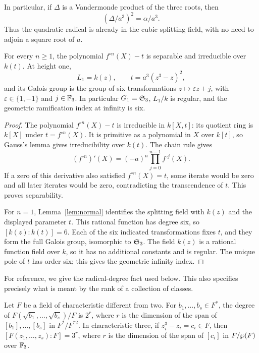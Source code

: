 In particular, if $\Delta$ is a Vandermonde product of the three
roots, then
\begin{equation}\label{eq:betavandermonde}
 (\Delta/a^3)^2=\alpha/a^3.
\end{equation}
Thus the quadratic radical is already in the cubic splitting field,
with no need to adjoin a square root of $a$.

\begin{lemma}\label{lem:first}
For every $n\geq1$, the polynomial $f^{\circ n}(X)-t$ is separable
and irreducible over $k(t)$. At height one,
\[
 L_1=k(z),\qquad t=a^3(z^3-z)^2,
\]
and its Galois group is the group of six transformations
$z\mapsto\varepsilon z+j$, with $\varepsilon\in\{1,-1\}$ and
$j\in\mathbb{F}_3$. In particular $G_1=\mathfrak{S}_3$, $L_1/k$ is regular, and
the geometric ramification index at infinity is six.
\end{lemma}

\begin{proof}
The polynomial $f^{\circ n}(X)-t$ is irreducible in $k[X,t]$:
its quotient ring is $k[X]$ under $t=f^{\circ n}(X)$. It is
primitive as a polynomial in $X$ over $k[t]$, so Gauss's lemma gives
irreducibility over $k(t)$. The chain rule gives
\begin{equation}\label{eq:iterate-derivative}
 (f^{\circ n})'(X)=(-a)^n\prod_{j=0}^{n-1}f^{\circ j}(X).
\end{equation}
If a zero of this derivative also satisfied $f^{\circ n}(X)=t$,
some iterate would be zero and all later iterates would be zero,
contradicting the transcendence of $t$. This proves separability.

For $n=1$, Lemma~\ref{lem:normal} identifies the splitting field
with $k(z)$ and the displayed parameter $t$. This rational function
has degree six, so $[k(z):k(t)]=6$. Each of the six indicated
transformations fixes $t$, and they form the full Galois group,
isomorphic to $\mathfrak{S}_3$. The field $k(z)$ is a rational function
field over $k$, so it has no additional constants and is regular.
The unique pole of $t$ has order six; this gives the geometric
infinity index.
\end{proof}

For reference, we give the radical-degree fact used below. This also
specifies precisely what is meant by the rank of a collection of
classes.

\begin{lemma}\label{lem:radicaldegree}
Let $F$ be a field of characteristic different from two. For
$b_1,\ldots,b_s\in F^*$, the degree of
$F(\sqrt{b_1},\ldots,\sqrt{b_s})/F$ is $2^r$, where $r$ is the
dimension of the span of $[b_1],\ldots,[b_s]$ in $F^*/F^{*2}$.
In characteristic three, if $z_i^3-z_i=c_i\in F$, then
$[F(z_1,\ldots,z_s):F]=3^r$, where $r$ is the dimension of the
span of $[c_i]$ in $F/\wp(F)$ over $\mathbb{F}_3$.
\end{lemma}

